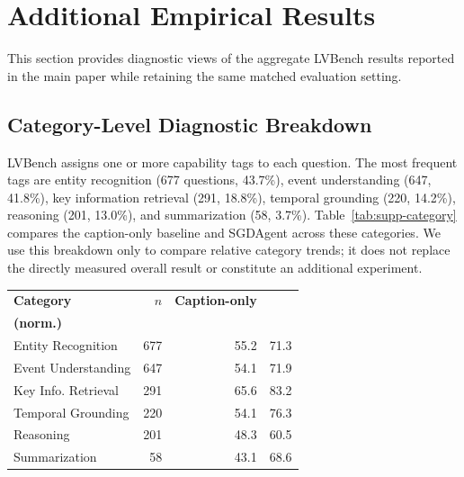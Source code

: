 \setcounter{table}{0}
\setcounter{figure}{0}
\setcounter{equation}{0}
\renewcommand{\thetable}{S\arabic{table}}
\renewcommand{\thefigure}{S\arabic{figure}}
\renewcommand{\theequation}{S\arabic{equation}}

\section{Additional Empirical Results}
\label{sec:supp-analysis}

This section provides diagnostic views of the aggregate LVBench results reported in the main paper while retaining the same matched evaluation setting.

\subsection{Category-Level Diagnostic Breakdown}

LVBench assigns one or more capability tags to each question.
The most frequent tags are entity recognition (677 questions, 43.7\%), event understanding (647, 41.8\%), key information retrieval (291, 18.8\%), temporal grounding (220, 14.2\%), reasoning (201, 13.0\%), and summarization (58, 3.7\%).
Table~\ref{tab:supp-category} compares the caption-only baseline and SGDAgent across these categories.
We use this breakdown only to compare relative category trends; it does not replace the directly measured overall result or constitute an additional experiment.

\begin{center}
  \centering
  \small
  \setlength{\tabcolsep}{3pt}
  \begin{tabular}{@{}lrrr@{}}
    \toprule
    \textbf{Category} &
    \textbf{$n$} &
    \textbf{Caption-only} &
    \shortstack{\textbf{SGDAgent}\\\textbf{(norm.)}} \\
    \midrule
    Entity Recognition & 677 & 55.2 & 71.3 \\
    Event Understanding & 647 & 54.1 & 71.9 \\
    Key Info. Retrieval & 291 & 65.6 & 83.2 \\
    Temporal Grounding & 220 & 54.1 & 76.3 \\
    Reasoning & 201 & 48.3 & 60.5 \\
    Summarization & 58 & 43.1 & 68.6 \\
    \bottomrule
  \end{tabular}
  \label{tab:supp-category}
\end{center}

